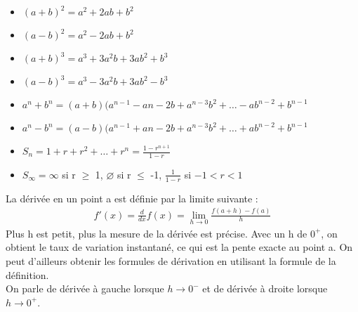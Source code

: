 \documentclass[10pt, french]{article}
\begin{document}
\begin{multicols*}{2}
\begin{definitionNOHFILLsub}
  \begin{itemize}
    \item $(a+b)^{2} = a^{2} + 2ab + b^{2}$
    \item $(a-b)^{2} = a^{2} - 2ab + b^{2}$
    \item $(a+b)^{3} = a^{3} + 3a^{2}b + 3ab^{2} + b^{3}$
    \item $(a-b)^{3} = a^{3} - 3a^{2}b + 3ab^{2} - b^{3}$
    \item $a^{n}+b^{n} = (a+b)(a^{n-1}-a{n-2}b+a^{n-3}b^{2}+ \dots -ab^{n-2}+b^{n-1}$
    \item $a^{n}-b^{n} = (a-b)(a^{n-1}+a{n-2}b+a^{n-3}b^{2}+ \dots +ab^{n-2}+b^{n-1}$
    \item $S_{n} = 1+r+r^{2}+ \dots +r^{n}=\frac{1-r^{n+1}}{1-r}$
    \item $S_{\infty} = \infty$ si r $\geq$ 1, $\varnothing$ si r $\leq$ -1, $\frac{1}{1-r}$ si $-1 < r < 1$
  \end{itemize}
\end{definitionNOHFILLsub}

\begin{definitionNOHFILLsub}
  La dérivée en un point a est définie par la limite suivante :\\
  \begin{align*}
    f'(x)=\frac{d}{dx} f(x)=\lim_{h \to 0} \frac{f(a+h)-f(a)}{h}
  \end{align*}
  Plus h est petit, plus la mesure de la dérivée est précise. Avec un h de $0^{+}$, on obtient le taux de variation instantané, ce qui est la pente exacte au point a. On peut d'ailleurs obtenir les formules de dérivation en utilisant la formule de la définition.\\
  On parle de dérivée à gauche lorsque $h \to 0^{-}$ et de dérivée à droite lorsque $h \to 0^{+}$.
  
\end{definitionNOHFILLsub}

\end{multicols*}
\end{document}
